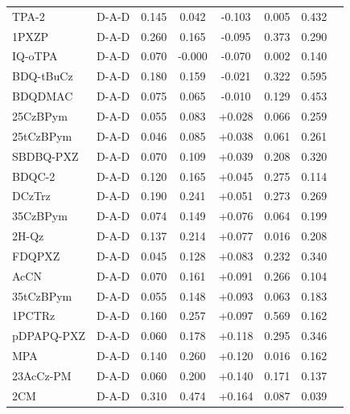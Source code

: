 \begin{longtable}{llcccccc}
TPA-2 & D-A-D & 0.145 & 0.042 & -0.103 & 0.005 & 0.432 & \cite{doi101016jmtchem2021100625} \\
1PXZP & D-A-D & 0.260 & 0.165 & -0.095 & 0.373 & 0.290 & \cite{doi101016jdyepig2020108437} \\
IQ-oTPA & D-A-D & 0.070 & -0.000 & -0.070 & 0.002 & 0.140 & \cite{doi101016jcej2021131510} \\
BDQ-tBuCz & D-A-D & 0.180 & 0.159 & -0.021 & 0.322 & 0.595 & \cite{doi101016jdyepig201702035} \\
BDQDMAC & D-A-D & 0.075 & 0.065 & -0.010 & 0.129 & 0.453 & \cite{doi101016jdyepig201702035} \\
25CzBPym & D-A-D & 0.055 & 0.083 & +0.028 & 0.066 & 0.259 & \cite{doi101039D1TC03998A} \\
25tCzBPym & D-A-D & 0.046 & 0.085 & +0.038 & 0.061 & 0.261 & \cite{doi101039D1TC03998A} \\
SBDBQ-PXZ & D-A-D & 0.070 & 0.109 & +0.039 & 0.208 & 0.320 & \cite{doi101039C7SC04669C} \\
BDQC-2 & D-A-D & 0.120 & 0.165 & +0.045 & 0.275 & 0.114 & \cite{doi101039C6TC04786F} \\
DCzTrz & D-A-D & 0.190 & 0.241 & +0.051 & 0.273 & 0.269 & \cite{doi101039C8NJ00767E} \\
35CzBPym & D-A-D & 0.074 & 0.149 & +0.076 & 0.064 & 0.199 & \cite{doi101039D1TC03998A} \\
2H-Qz & D-A-D & 0.137 & 0.214 & +0.077 & 0.016 & 0.208 & \cite{doi101039D1TC02633J} \\
FDQPXZ & D-A-D & 0.045 & 0.128 & +0.083 & 0.232 & 0.340 & \cite{doi101016jorgel2022106518} \\
AcCN & D-A-D & 0.070 & 0.161 & +0.091 & 0.266 & 0.104 & \cite{doi101016jdyepig2019107775} \\
35tCzBPym & D-A-D & 0.055 & 0.148 & +0.093 & 0.063 & 0.183 & \cite{doi101039D1TC03998A} \\
1PCTRz & D-A-D & 0.160 & 0.257 & +0.097 & 0.569 & 0.162 & \cite{doi101039C9TC05550A} \\
pDPAPQ-PXZ & D-A-D & 0.060 & 0.178 & +0.118 & 0.295 & 0.346 & \cite{doi101016jcej2022135775} \\
MPA & D-A-D & 0.140 & 0.260 & +0.120 & 0.016 & 0.162 & \cite{doi101016jdyepig2021109392} \\
23AcCz-PM & D-A-D & 0.060 & 0.200 & +0.140 & 0.171 & 0.137 & \cite{doi101039C9TC04284A} \\
2CM & D-A-D & 0.310 & 0.474 & +0.164 & 0.087 & 0.039 & \cite{doi101016jsynthmet201611015} \\

\end{longtable}
